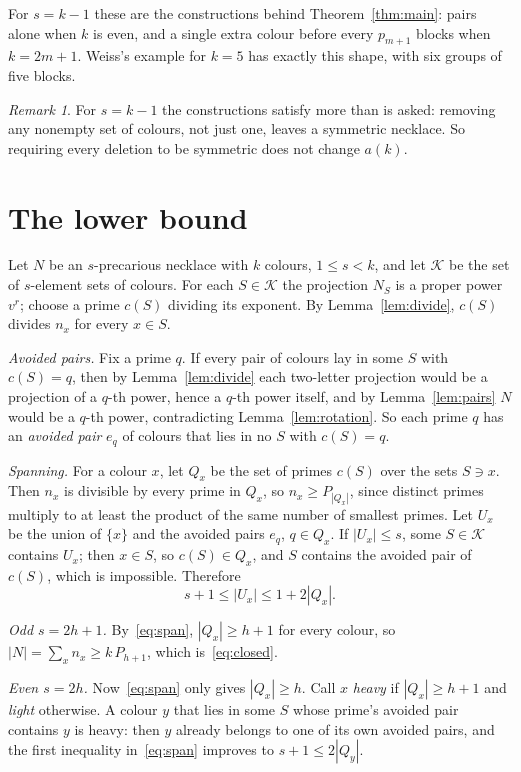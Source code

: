 \documentclass[11pt,a4paper]{article}
\theoremstyle{remark}
\newtheorem*{remark}{Remark}
\begin{document}
For $s=k-1$ these are the constructions behind Theorem~\ref{thm:main}:
pairs alone when $k$ is even, and a single extra colour before every
$p_{m+1}$ blocks when $k=2m+1$. Weiss's example for $k=5$ has exactly
this shape, with six groups of five blocks.

\begin{remark}
For $s=k-1$ the constructions satisfy more than is asked: removing any
nonempty set of colours, not just one, leaves a symmetric necklace. So
requiring every deletion to be symmetric does not change $a(k)$.
\end{remark}

\section{The lower bound}

Let $N$ be an $s$-precarious necklace with $k$ colours, $1\le s<k$, and
let $\mathcal K$ be the set of $s$-element sets of colours. For each
$S\in\mathcal K$ the projection $N_S$ is a proper power $v^{r}$; choose a
prime $c(S)$ dividing its exponent. By Lemma~\ref{lem:divide}, $c(S)$
divides $n_x$ for every $x\in S$.

\emph{Avoided pairs.} Fix a prime $q$. If every pair of colours lay in
some $S$ with $c(S)=q$, then by Lemma~\ref{lem:divide} each two-letter
projection would be a projection of a $q$-th power, hence a $q$-th power
itself, and by Lemma~\ref{lem:pairs} $N$ would be a $q$-th power,
contradicting Lemma~\ref{lem:rotation}. So each prime $q$ has an
\emph{avoided pair} $e_q$ of colours that lies in no $S$ with $c(S)=q$.

\emph{Spanning.} For a colour $x$, let $Q_x$ be the set of primes $c(S)$
over the sets $S\ni x$. Then $n_x$ is divisible by every prime in $Q_x$,
so $n_x\ge P_{|Q_x|}$, since distinct primes multiply to at least the
product of the same number of smallest primes. Let $U_x$ be the union of
$\{x\}$ and the avoided pairs $e_q$, $q\in Q_x$. If $|U_x|\le s$, some
$S\in\mathcal K$ contains $U_x$; then $x\in S$, so $c(S)\in Q_x$, and $S$
contains the avoided pair of $c(S)$, which is impossible. Therefore
\begin{equation}\label{eq:span}
s+1\le|U_x|\le 1+2|Q_x|.
\end{equation}

\emph{Odd $s=2h+1$.} By~\eqref{eq:span}, $|Q_x|\ge h+1$ for every colour,
so $|N|=\sum_x n_x\ge k\,P_{h+1}$, which is~\eqref{eq:closed}.

\emph{Even $s=2h$.} Now~\eqref{eq:span} only gives $|Q_x|\ge h$. Call $x$
\emph{heavy} if $|Q_x|\ge h+1$ and \emph{light} otherwise. A colour $y$
that lies in some $S$ whose prime's avoided pair contains $y$ is heavy:
then $y$ already belongs to one of its own avoided pairs, and the first
inequality in~\eqref{eq:span} improves to $s+1\le 2|Q_y|$.
\end{document}
